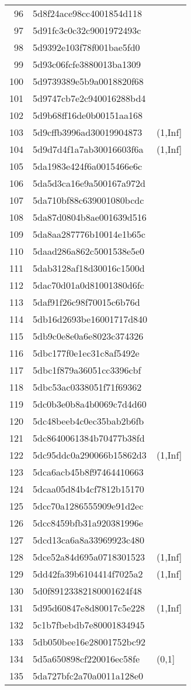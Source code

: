 \begin{table}[ht]
\begin{tabular}{rll}
  96 & 5d8f24ace98cc4001854d118 &  \\ 
  97 & 5d91fc3c0c32c9001972493c &  \\ 
  98 & 5d9392e103f78f001bae5fd0 &  \\ 
  99 & 5d93c06fcfe3880013ba1309 &  \\ 
  100 & 5d9739389e5b9a0018820f68 &  \\ 
  101 & 5d9747cb7e2c940016288bd4 &  \\ 
  102 & 5d9b68ff16de0b00151aa168 &  \\ 
  103 & 5d9cffb3996ad30019904873 & (1,Inf] \\ 
  104 & 5d9d7d4f1a7ab30016603f6a & (1,Inf] \\ 
  105 & 5da1983e424f6a0015466e6c &  \\ 
  106 & 5da5d3ca16e9a500167a972d &  \\ 
  107 & 5da710bf88c639001080bcdc &  \\ 
  108 & 5da87d0804b8ae001639d516 &  \\ 
  109 & 5da8aa287776b10014e1b65c &  \\ 
  110 & 5daad286a862c5001538e5e0 &  \\ 
  111 & 5dab3128af18d30016c1500d &  \\ 
  112 & 5dac70d01a0d81001380d6fc &  \\ 
  113 & 5daf91f26c98f70015c6b76d &  \\ 
  114 & 5db16d2693be16001717d840 &  \\ 
  115 & 5db9c0e8e0a6e8023c374326 &  \\ 
  116 & 5dbc177f0e1ec31c8af5492e &  \\ 
  117 & 5dbc1f879a36051cc3396cbf &  \\ 
  118 & 5dbc53ac0338051f71f69362 &  \\ 
  119 & 5dc0b3e0b8a4b0069c7d4d60 &  \\ 
  120 & 5dc48beeb4c0ec35bab2b6fb &  \\ 
  121 & 5dc8640061384b70477b38fd &  \\ 
  122 & 5dc95ddc0a290066b15862d3 & (1,Inf] \\ 
  123 & 5dca6acb45b8f97464410663 &  \\ 
  124 & 5dcaa05d84b4cf7812b15170 &  \\ 
  125 & 5dcc70a1286555909e91d2ec &  \\ 
  126 & 5dcc8459bfb31a920381996e &  \\ 
  127 & 5dcd13ca6a8a33969923c480 &  \\ 
  128 & 5dce52a84d695a0718301523 & (1,Inf] \\ 
  129 & 5dd42fa39b6104414f7025a2 & (1,Inf] \\ 
  130 & 5d0f89123382180001624f48 &  \\ 
  131 & 5d95d60847e8d80017c5e228 & (1,Inf] \\ 
  132 & 5c1b7fbebdb7e80001834945 &  \\ 
  133 & 5db050bee16e28001752bc92 &  \\ 
  134 & 5d5a650898cf220016ec58fe & (0,1] \\ 
  135 & 5da727bfc2a70a0011a128e0 &  \\ 
   \hline
\end{tabular}
\end{table}
